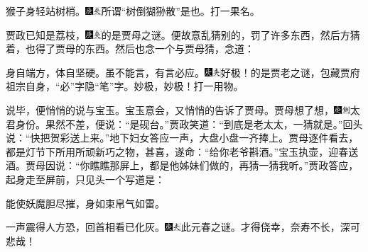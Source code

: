 猴子身轻站树梢。{\includegraphics[width=3mm]{../Images/00004}\includegraphics[width=3mm]{../Images/00012}\footnotesize \kaishu 所谓``树倒猢狲散''是也。}打一果名。

贾政已知是荔枝，{\includegraphics[width=3mm]{../Images/00004}\includegraphics[width=3mm]{../Images/00012}\footnotesize \kaishu 的是贾母之谜。}便故意乱猜别的，罚了许多东西，然后方猜着，也得了贾母的东西。然后也念一个与贾母猜，念道：

身自端方，体自坚硬。虽不能言，有言必应。{\includegraphics[width=3mm]{../Images/00004}\includegraphics[width=3mm]{../Images/00012}\footnotesize \kaishu 好极！的是贾老之谜，包藏贾府祖宗自身，``必''字隐``笔''字。妙极，妙极！}打一用物。

说毕，便悄悄的说与宝玉。宝玉意会，又悄悄的告诉了贾母。贾母想了想，{\includegraphics[width=3mm]{../Images/00004}\includegraphics[width=3mm]{../Images/00011}\footnotesize \kaishu 太君身份。}果然不差，便说：``是砚台。''贾政笑道：``到底是老太太，一猜就是。''回头说：``快把贺彩送上来。''地下妇女答应一声，大盘小盘一齐捧上。贾母逐件看去，都是灯节下所用所顽新巧之物，甚喜，遂命：``给你老爷斟酒。''宝玉执壶，迎春送酒。贾母因说：``你瞧瞧那屏上，都是他姊妹们做的，再猜一猜我听。''贾政答应，起身走至屏前，只见头一个写道是：

能使妖魔胆尽摧，身如束帛气如雷。

一声震得人方恐，回首相看已化灰。{\includegraphics[width=3mm]{../Images/00004}\includegraphics[width=3mm]{../Images/00012}\footnotesize \kaishu 此元春之谜。才得侥幸，奈寿不长，深可悲哉！}

